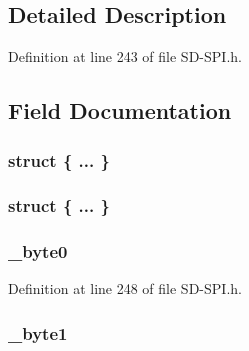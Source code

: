 \subsection{Detailed Description}


Definition at line 243 of file S\+D-\/\+S\+P\+I.\+h.



\subsection{Field Documentation}
\hypertarget{union_r_e_s_p_o_n_s_e__2_aa3ef3ab470d92604e44e1f5dfdc8c445}{}\subsubsection[{"@21}]{\setlength{\rightskip}{0pt plus 5cm}struct \{ ... \} }\label{union_r_e_s_p_o_n_s_e__2_aa3ef3ab470d92604e44e1f5dfdc8c445}
\hypertarget{union_r_e_s_p_o_n_s_e__2_ae4c77d96417373d3ad56569fe13c4351}{}\subsubsection[{"@23}]{\setlength{\rightskip}{0pt plus 5cm}struct \{ ... \} }\label{union_r_e_s_p_o_n_s_e__2_ae4c77d96417373d3ad56569fe13c4351}
\hypertarget{union_r_e_s_p_o_n_s_e__2_a93716eb22819e26ee62f5d28d97adb9f}{}
\subsubsection[{\+\_\+byte0}]{ \+\_\+byte0}\label{union_r_e_s_p_o_n_s_e__2_a93716eb22819e26ee62f5d28d97adb9f}


Definition at line 248 of file S\+D-\/\+S\+P\+I.\+h.

\hypertarget{union_r_e_s_p_o_n_s_e__2_a7d5f3b40b15af6ed45be5faa5100147c}{}
\subsubsection[{\+\_\+byte1}]{ \+\_\+byte1}\label{union_r_e_s_p_o_n_s_e__2_a7d5f3b40b15af6ed45be5faa5100147c}


